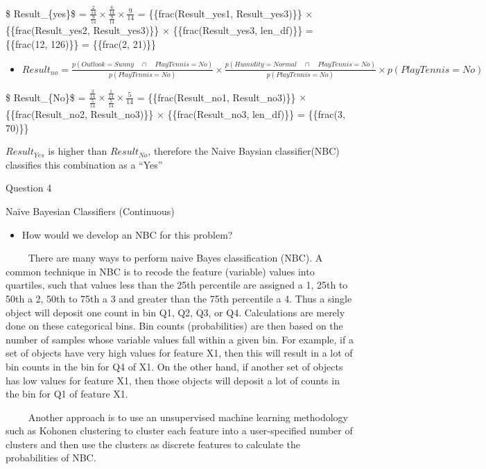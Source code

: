 \documentclass[11pt]{article}
\providecommand{\tightlist}{%
      \setlength{\itemsep}{0pt}\setlength{\parskip}{0pt}}
\begin{document}
\$ \qquad \qquad Result\_\{yes\}\$ =
\(\frac{\frac{2}{14}}{\frac{9}{14}} \times \frac{\frac{6}{14}}{\frac{9}{14}} \times \frac{9}{14}\)
= \{\{frac(Result\_yes1, Result\_yes3)\}\} \(\times\)
\{\{frac(Result\_yes2, Result\_yes3)\}\} \(\times\)
\{\{frac(Result\_yes3, len\_df)\}\} = \{\{frac(12, 126)\}\} =
\{\{frac(2, 21)\}\}

\begin{itemize}
\tightlist
\item
  \(Result_{no} = \frac{p(Outlook = Sunny \quad \cap \quad PlayTennis = No)}{p(PlayTennis = No)} \times \frac{p(Humidity = Normal \quad \cap \quad PlayTennis = No)}{p(PlayTennis = No)} \times p(PlayTennis = No)\)
\end{itemize}

\$ \qquad \qquad Result\_\{No\}\$ =
\(\frac{\frac{3}{14}}{\frac{5}{14}} \times \frac{\frac{1}{14}}{\frac{5}{14}} \times \frac{5}{14}\)
= \{\{frac(Result\_no1, Result\_no3)\}\} \(\times\)
\{\{frac(Result\_no2, Result\_no3)\}\} \(\times\) \{\{frac(Result\_no3,
len\_df)\}\} = \{\{frac(3, 70)\}\}

\(Result_{Yes}\) is higher than \(Result_{No}\), therefore the Naive
Baysian classifier(NBC) classifies this combination as a ``Yes''

    Question 4

Naïve Bayesian Classifiers (Continuous)

\begin{itemize}
\tightlist
\item
  How would we develop an NBC for this problem?
\end{itemize}

\(\qquad\) There are many ways to perform naive Bayes classification
(NBC). A common technique in NBC is to recode the feature (variable)
values into quartiles, such that values less than the 25th percentile
are assigned a 1, 25th to 50th a 2, 50th to 75th a 3 and greater than
the 75th percentile a 4. Thus a single object will deposit one count in
bin Q1, Q2, Q3, or Q4. Calculations are merely done on these categorical
bins. Bin counts (probabilities) are then based on the number of samples
whose variable values fall within a given bin. For example, if a set of
objects have very high values for feature X1, then this will result in a
lot of bin counts in the bin for Q4 of X1. On the other hand, if another
set of objects has low values for feature X1, then those objects will
deposit a lot of counts in the bin for Q1 of feature X1.

\(\qquad\) Another approach is to use an unsupervised machine learning
methodology such as Kohonen clustering to cluster each feature into a
user-specified number of clusters and then use the clusters as discrete
features to calculate the probabilities of NBC.


    
    
    
    
\end{document}
